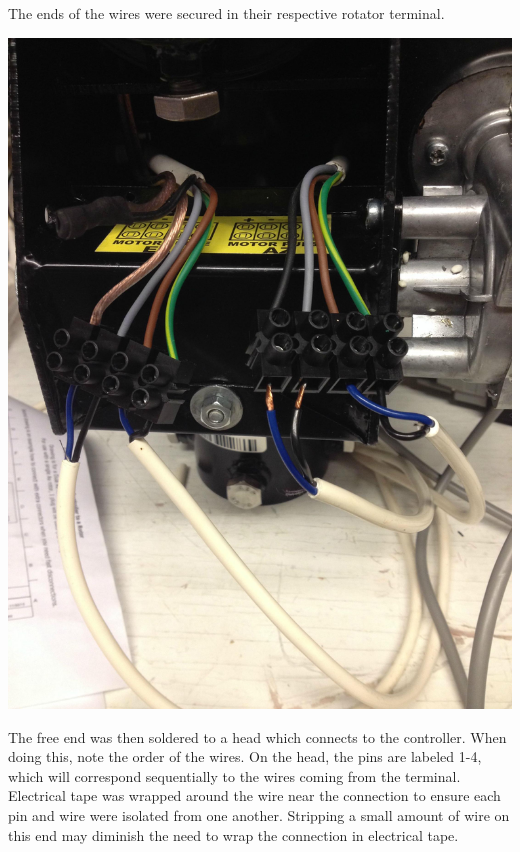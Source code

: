 \documentclass[11pt]{article} %
\begin{document}
The ends of the wires were secured in their respective rotator terminal.

\begin{center}
\includegraphics[scale=0.10]{wiring/07.jpeg}
\end{center}

The free end was then soldered to a head which connects to the controller. When doing this, note the order of the wires. On the head, the pins are labeled 1-4, which will correspond sequentially to the wires coming from the terminal. Electrical tape was wrapped around the wire near the connection to ensure each pin and wire were isolated from one another. Stripping a small amount of wire on this end may diminish the need to wrap the connection in electrical tape.
\end{document}
